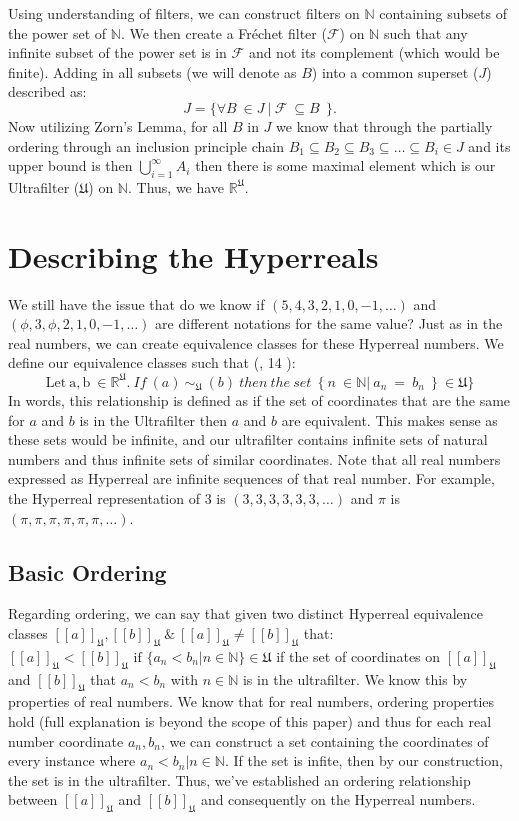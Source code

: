 \documentclass[12pt]{report}
\newcommand{\R}{\mathbb{R}}
\newcommand{\N}{\mathbb{N}}
\newcommand{\U}{\mathfrak{U}}
\begin{document}
Using understanding of filters, we can construct filters on $\N$ containing subsets of the power set of $\N$.
We then create a Fr\'echet filter ($\mathcal{F}$) on $\N$ such that any infinite subset of the power set is in $\mathcal{F}$ and not its complement (which would be finite).
Adding in all subsets (we will denote as $B$) into a common superset ($J$) described as:\[J=\{\forall B\ \in J\ |\ \mathcal{F}\ \subseteq B\ \ \}.\]
Now utilizing Zorn's Lemma, for all $B$ in $J$ we know that through the partially ordering through an inclusion principle chain $B_1\subseteq B_2\subseteq B_3\subseteq\ldots\subseteq B_i\in J $ and its upper bound is then $\bigcup_{i=1}^{\infty}A_i$ then there is some maximal element which is our Ultrafilter ($\U$) on $\N$.
Thus, we have $\R^{\mathfrak{U}} $.


\chapter{ Describing the Hyperreals}
We still have the issue that do we know if $(5,4,3,2,1,0,-1,\ldots)$ and $(\phi,3,\phi, 2,1,0,-1,\ldots)$ are different notations for the same value?
Just as in the real numbers, we can create equivalence classes for these Hyperreal numbers.
We define our equivalence classes such that (, 14 ):
\[\mathrm{Let\ a,b\ \in \R^{\U}}.\ If\ (a)\ \sim_{\U}\ (b)\ then\ the\ set\ \ \{\ n\ \in \N|\ a_{n}\ =\ b_{n}\ \ \}\ \in \U \}\]
In words, this relationship is defined as if the set of coordinates that are the same for $a$ and $b$ is in the Ultrafilter then $a$ and $b$ are equivalent.
This makes sense as these sets would be infinite, and our ultrafilter contains infinite sets of natural numbers and thus infinite sets of similar coordinates.
Note that all real numbers expressed as Hyperreal are infinite sequences of that real number.
For example, the Hyperreal representation of 3 is $(3,3,3,3,3, 3, \ldots)$ and $\pi$ is $(\pi, \pi, \pi,\pi, \pi, \pi, \ldots)$.
\section*{Basic Ordering}
Regarding ordering, we can say that given two distinct Hyperreal equivalence classes $  [[a]]_{\U}, [[b]]_{\U} \ \& \ [[a]]_{\U}\not= [[b]]_{\U} $ that: $ [[a]]_{\U}< [[b]]_{\U} \text{ if }\{a_n < b_n | n \in \N \} \in \U $ if the set of coordinates on $[[a]]_{\U}$ and $[[b]]_{\U}$ that $a_n < b_n$ with $n \in \N $ is in the ultrafilter.
We know this by properties of real numbers.
We know that for real numbers, ordering properties hold (full explanation is beyond the scope of this paper) and thus for each real number coordinate $a_n, b_n$, we can construct a set containing the coordinates of every instance where $a_n < b_n | n \in \N$.
If the set is infite, then by our construction, the set is in the ultrafilter.
Thus, we've established an ordering relationship between $[[a]]_{\U}$ and $[[b]]_{\U}$ and consequently on the Hyperreal numbers.
\end{document}

